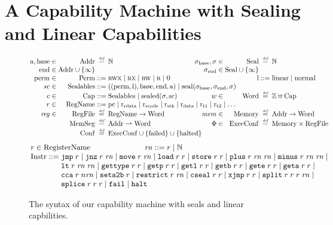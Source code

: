 \documentclass[acmsmall,review,anonymous]{acmart}\settopmatter{printfolios=true,printccs=false,printacmref=false}
\renewcommand{\MemSeg}{\shareddom{MemSeg}}
\renewcommand{\Reg}{\shareddom{RegFile}}
\renewcommand{\RegName}{\shareddom{RegName}}
\renewcommand{\SealableCaps}{\shareddom{Sealables}}
\renewcommand{\rretc}{\mathrm{r}_{\mathrm{rcode}}}
\renewcommand{\rretd}{\mathrm{r}_{\mathrm{rdata}}}
\begin{document}
\section{A Capability Machine with Sealing and Linear Capabilities}
\label{sec:cap-mach-w-seal-and-lin}
\begin{figure}[tb]
  \centering
  \[
  \arraycolsep=1.4pt
  \begin{array}{rrcl l rrcl}
   \addrbnf,\basebnf \in & \Addr & \defeq & \nats & \phantom{mak} & \sealbasebnf, \sigma \in & \Seal & \defeq & \nats\\
    \aendbnf \in & \Addr \cup \{\infty \} & & & & \sealendbnf \in & \Seal \cup \{\infty \}& &\\
    \permbnf \in& \Perm & \defbnf & \rwx \mid \rx \mid \rw \mid \ro \mid \noperm & & &\linbnf & \defbnf & \linear \mid \normal\\
    \vsc \in &\SealableCaps&\defbnf & \multicolumn{6}{l}{((\permbnf,\linbnf),\basebnf,\aendbnf,\addrbnf) \mid \seal{\sealbasebnf,\sealendbnf,\sigma}}\\
    c \in&\Caps& \defbnf &  \SealableCaps \mid \sealed{\sigma,\scbnf} & & w \in &\Word & \defeq & \ints \uplus \Caps\\ 
    r \in& \RegName & \defbnf & \multicolumn{6}{l}{\pcreg \mid \rretd \mid \rretc \mid \rstk \mid \rdata \mid \rtmp{1} \mid \rtmp{2} \mid \dots} \\
    \reg \in &\Reg & \defeq & \RegName \fun \Word & & \mem \in&\Mem & \defeq & \Addr \fun \Word\\
    &\MemSeg & \defeq & \Addr \parfun \Word & & \Phi \in & \ExecConf & \defeq & \Mem \times \Reg\\
    &\Conf & \defeq & \multicolumn{6}{l}{\ExecConf \cup \{\failed\} \cup \{\halted\} }
  \end{array}
\]
\[
  \arraycolsep=1.4pt
\begin{array}{rcl}
\multicolumn{3}{l}{    \arraycolsep=0pt
      \com{r} \in  \tRegName \hspace{2.5cm}   \com{\rn} \defbnf \com{r} \mid \nats
}\\
  \Instr &\defbnf & \tjmp{\com{r}} \mid \tjnz{\com{r}}{\com{\rn}} \mid \tmove{\com{r}}{\com{\rn}} \mid \tload{\com{r}}{\com{r}} \mid \tstore{\com{r}}{\com{r}} \mid \tplus{\com{r}}{\com{\rn}}{\com{\rn}} \mid \tminus{\com{r}}{\com{\rn}}{\com{\rn}} \mid\\
         & & \tlt{\com{r}}{\com{\rn}}{\com{\rn}} \mid \tisptr{\com{r}}{\com{r}} \mid\tgetp{\com{r}}{\com{r}} \mid \tgetlin{\com{r}}{\com{r}} \mid \tgetb{\com{r}}{\com{r}} \mid \tgete{\com{r}}{\com{r}} \mid \tgeta{\com{r}}{\com{r}}  \mid \\
  & & \tcca{\com{r}}{\com{n\rn}} \mid \tsetatob{\com{r}} \mid \trestrict{\com{r}}{\com{\rn}} \mid \tcseal{\com{r}}{\com{r}} \mid \txjmp{\com{r}}{\com{r}} \mid  \tsplit{\com{r}}{\com{r}}{\com{r}}{\com{\rn}} \mid\\ 
      & & \tsplice{\com{r}}{\com{r}}{\com{r}} \mid \tfail \mid \thalt 
\end{array}
\]
  \caption{The syntax of our capability machine with seals and linear capbilities.}
  \label{fig:target-syntax}
\end{figure}
\end{document}
